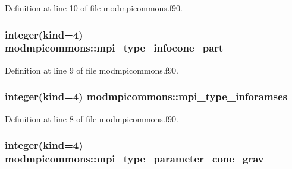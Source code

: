 Definition at line 10 of file modmpicommons.\+f90.

\subsubsection[{\texorpdfstring{mpi\+\_\+type\+\_\+infocone\+\_\+part}{mpi_type_infocone_part}}]{\setlength{\rightskip}{0pt plus 5cm}integer(kind=4) modmpicommons\+::mpi\+\_\+type\+\_\+infocone\+\_\+part}\hypertarget{namespacemodmpicommons_a47d1927be23cfeeb8ca1750bfc8667ca}{}\label{namespacemodmpicommons_a47d1927be23cfeeb8ca1750bfc8667ca}


Definition at line 9 of file modmpicommons.\+f90.

\subsubsection[{\texorpdfstring{mpi\+\_\+type\+\_\+inforamses}{mpi_type_inforamses}}]{\setlength{\rightskip}{0pt plus 5cm}integer(kind=4) modmpicommons\+::mpi\+\_\+type\+\_\+inforamses}\hypertarget{namespacemodmpicommons_a7209ec50a2345627928ec7f683f09392}{}\label{namespacemodmpicommons_a7209ec50a2345627928ec7f683f09392}


Definition at line 8 of file modmpicommons.\+f90.

\subsubsection[{\texorpdfstring{mpi\+\_\+type\+\_\+parameter\+\_\+cone\+\_\+grav}{mpi_type_parameter_cone_grav}}]{\setlength{\rightskip}{0pt plus 5cm}integer(kind=4) modmpicommons\+::mpi\+\_\+type\+\_\+parameter\+\_\+cone\+\_\+grav}\hypertarget{namespacemodmpicommons_ab28bb5018211e0f3fef44b29db2e6b13}{}\label{namespacemodmpicommons_ab28bb5018211e0f3fef44b29db2e6b13}


